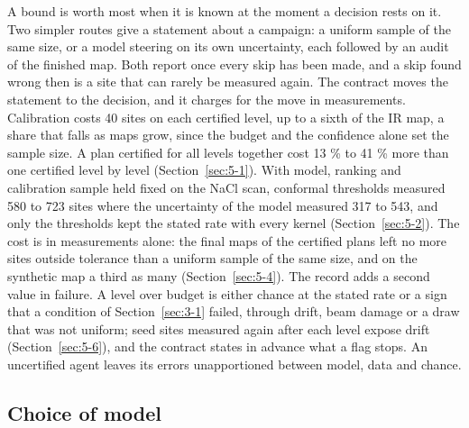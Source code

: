 \documentclass{iopjournal}
\begin{document}
A bound is worth most when it is known at the moment a decision rests on it. Two simpler routes give a statement about a campaign: a uniform sample of the same size, or a model steering on its own uncertainty, each followed by an audit of the finished map. Both report once every skip has been made, and a skip found wrong then is a site that can rarely be measured again. The contract moves the statement to the decision, and it charges for the move in measurements. Calibration costs 40 sites on each certified level, up to a sixth of the IR map, a share that falls as maps grow, since the budget and the confidence alone set the sample size. A plan certified for all levels together cost 13 \% to 41 \% more than one certified level by level (Section~\ref{sec:5-1}). With model, ranking and calibration sample held fixed on the NaCl scan, conformal thresholds measured 580 to 723 sites where the uncertainty of the model measured 317 to 543, and only the thresholds kept the stated rate with every kernel (Section~\ref{sec:5-2}). The cost is in measurements alone: the final maps of the certified plans left no more sites outside tolerance than a uniform sample of the same size, and on the synthetic map a third as many (Section~\ref{sec:5-4}). The record adds a second value in failure. A level over budget is either chance at the stated rate or a sign that a condition of Section~\ref{sec:3-1} failed, through drift, beam damage or a draw that was not uniform; seed sites measured again after each level expose drift (Section~\ref{sec:5-6}), and the contract states in advance what a flag stops. An uncertified agent leaves its errors unapportioned between model, data and chance.

\hypertarget{choice-of-model}{%
\subsection{Choice of model}\label{choice-of-model}}
\end{document}
